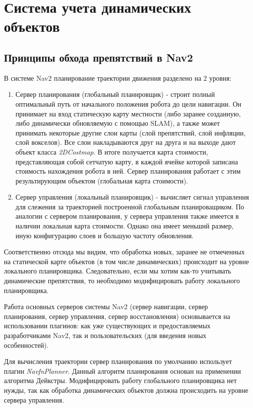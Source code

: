 \section{Система учета динамических объектов}

\subsection{Принципы обхода препятствий в Nav2}

В системе Nav2 планирование траектории движения разделено на 2 уровня:
\begin{enumerate}
    \item Сервер планирования (глобальный планировщик) - строит полный оптимальный путь от начального положения робота до цели навигации. Он принимает на вход статическую карту местности (либо заранее созданную, либо динамически обновляемую с помощью SLAM), а также может принимать некоторые другие слои карты (слой препятствий, слой инфляции, слой вокселов). Все слои накладываются друг на друга и на выходе дают объект класса \textit{2DCostmap}. В итоге получается карта стоимости, представляющая собой сетчатую карту, в каждой ячейке которой записана стоимость нахождения робота в ней. Сервер планирования работает с этим результирующим объектом (глобальная карта стоимости).
    \item Сервер управления (локальный планировщик) - вычисляет сигнал управления для слежения за траекторией построенной глобальным планироващиком. По аналогии с сервером планирования, у сервера управления также имеется в наличии локальная карта стоимости. Однако она имеет меньший размер, иную конфигурацию слоев и большую частоту обновления.
\end{enumerate}

Соответственно отсюда мы видим, что обработка новых, заранее не отмеченных на статической карте объектов (в том числе динамических) происходит на уровне локального планировщика. Следовательно, если мы хотим как-то учитывать динамические препятствия, то необходимо модифицировать работу локального планировщика.

Работа основных серверов системы Nav2 (сервер навигации, сервер планирования, сервер управления, сервер восстановления) основывается на использовании плагинов: как уже существующих и предоставляемых разработчиками Nav2, так и пользовательских (для введения новых особенностей).

Для вычисления траектории сервер планирования по умолчанию использует плагин \textit{NavfnPlanner}. Данный алгоритм планирования основан на применении алгоритма Дейкстры. Модифицировать работу глобального планировщика нет нужды, так как обработка динамических объектов должна происходить на уровне сервера управления.

